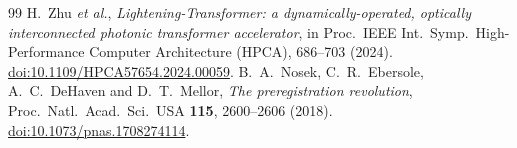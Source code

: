 \documentclass[11pt,a4paper]{article}
\newcommand{\doi}[1]{\href{https://doi.org/#1}{doi:#1}}
\begin{document}
\begin{thebibliography}{99}
 H.~Zhu \emph{et al.},
  \emph{Lightening-Transformer: a dynamically-operated, optically
  interconnected photonic transformer accelerator}, in Proc.\ IEEE Int.\ Symp.\
  High-Performance Computer Architecture (HPCA), 686--703 (2024). \doi{10.1109/HPCA57654.2024.00059}.
\bibitem{nosek} B.~A.~Nosek, C.~R.~Ebersole, A.~C.~DeHaven and D.~T.~Mellor,
  \emph{The preregistration revolution}, Proc.\ Natl.\ Acad.\ Sci.\ USA
  \textbf{115}, 2600--2606 (2018). \doi{10.1073/pnas.1708274114}.
\end{thebibliography}
\end{document}
